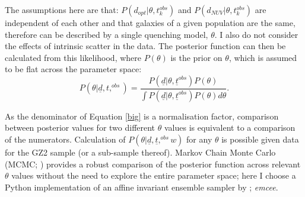 \documentclass{mn2e}
\begin{document}
The assumptions here are that: $P(d_{opt}|\theta, t^{obs}_{k})$ and $P(d_{NUV}|\theta, t^{obs}_{k})$ are independent of each other and that galaxies of a given population are the same, therefore can be described by a single quenching model, $\theta$. I also do not consider the effects of intrinsic scatter in the data.
%
The posterior function can then be calculated from this likelihood, where $P(\theta)$ is the prior on $\theta$, which is assumed to be flat across the parameter space:
\begin{equation}\label{big}
P(\theta|\underline{d}, t,^{obs}) = \frac{P(\underline{d}|\theta, \underline{t}^{obs})P(\theta)}{\int P(\underline{d}|\theta, \underline{t}^{obs})P(\theta) d\theta}.
\end{equation}


As the denominator of Equation \ref{big} is a normalisation factor, comparison between posterior values for two different  $\theta$ values is equivalent to a comparison of the numerators. Calculation of $P(\theta|\underline{d}, \underline{t},^{obs} w)$  for any $\theta$ is possible given data for the GZ2 sample (or a sub-sample thereof). Markov Chain Monte Carlo (MCMC; \citealt{MacKay, Dan, GW10}) provides a robust comparison of the posterior function across relevant $\theta$ values without the need to explore the entire parameter space; here I choose a Python implementation of an affine invariant ensemble sampler by \cite{Dan}; \emph{emcee}.
\end{document}
